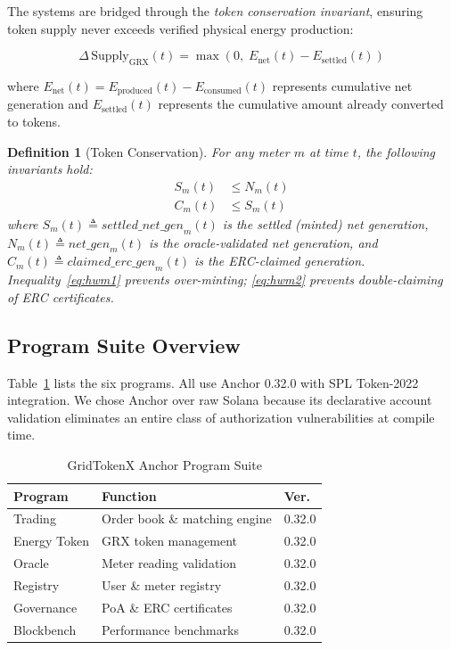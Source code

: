 \documentclass[conference]{IEEEtran}
\newtheorem{definition}{Definition}
\begin{document}
The systems are bridged through the \textit{token conservation invariant}, ensuring token supply never exceeds verified physical energy production:

\begin{equation}
\Delta\,\text{Supply}_{\text{GRX}}(t) = \max\!\left(0,\; E_{\text{net}}(t) - E_{\text{settled}}(t)\right)
\label{eq:conservation}
\end{equation}

where $E_{\text{net}}(t) = E_{\text{produced}}(t) - E_{\text{consumed}}(t)$ represents cumulative net generation and $E_{\text{settled}}(t)$ represents the cumulative amount already converted to tokens.

\begin{definition}[Token Conservation]
\label{def:conservation}
For any meter $m$ at time $t$, the following invariants hold:
\begin{align}
S_m(t) &\leq N_m(t) \label{eq:hwm1} \\
C_m(t) &\leq S_m(t) \label{eq:hwm2}
\end{align}
where $S_m(t) \triangleq \mathit{settled\_net\_gen}_m(t)$ is the settled (minted) net generation, $N_m(t) \triangleq \mathit{net\_gen}_m(t)$ is the oracle-validated net generation, and $C_m(t) \triangleq \mathit{claimed\_erc\_gen}_m(t)$ is the ERC-claimed generation. Inequality~\eqref{eq:hwm1} prevents over-minting; \eqref{eq:hwm2} prevents double-claiming of ERC certificates.
\end{definition}

\subsection{Program Suite Overview}

Table~\ref{tab:programs} lists the six programs. All use Anchor 0.32.0 with SPL Token-2022 integration. We chose Anchor over raw Solana because its declarative account validation eliminates an entire class of authorization vulnerabilities at compile time.

\begin{table}[htbp]
\caption{GridTokenX Anchor Program Suite}
\begin{center}
\small
\begin{tabular}{@{}lll@{}}
\toprule
\textbf{Program} & \textbf{Function} & \textbf{Ver.} \\
\midrule
Trading & Order book \& matching engine & 0.32.0 \\
Energy Token & GRX token management & 0.32.0 \\
Oracle & Meter reading validation & 0.32.0 \\
Registry & User \& meter registry & 0.32.0 \\
Governance & PoA \& ERC certificates & 0.32.0 \\
Blockbench & Performance benchmarks & 0.32.0 \\
\bottomrule
\end{tabular}
\label{tab:programs}
\end{center}
\end{table}
\end{document}
